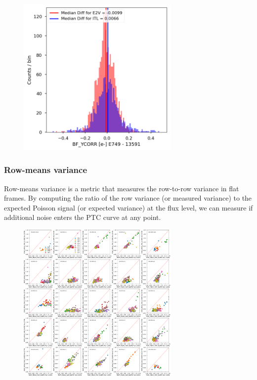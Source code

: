 \begin{figure}[H]
\begin{centering}
\includegraphics[width=0.7\textwidth]{sections/figures/baselineCharacterization/BF_YCORR_13591_E749_diff.png}
\end{centering}
\end{figure}

\subsubsection{Row-means variance}\label{row-means-var}

Row-means variance is a metric that measures the row-to-row variance in flat frames. By computing the ratio of the row variance (or measured variance) to the expected Poisson signal (or expected variance) at the flux level, we can measure if additional noise enters the PTC curve at any point.

\begin{figure}[H]
\begin{centering}
\includegraphics[width=0.7\textwidth]{sections/figures/baselineCharacterization/13591_E749_ROW_MEAN_VAR_SLOPE.png}
\end{centering}
\end{figure}

